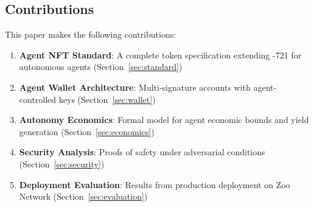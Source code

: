 \subsection{Contributions}

This paper makes the following contributions:

\begin{enumerate}
    \item \textbf{Agent NFT Standard}: A complete token specification extending \ERC{}-721 for autonomous agents (Section~\ref{sec:standard})

    \item \textbf{Agent Wallet Architecture}: Multi-signature accounts with agent-controlled keys (Section~\ref{sec:wallet})

    \item \textbf{Autonomy Economics}: Formal model for agent economic bounds and yield generation (Section~\ref{sec:economics})

    \item \textbf{Security Analysis}: Proofs of safety under adversarial conditions (Section~\ref{sec:security})

    \item \textbf{Deployment Evaluation}: Results from production deployment on Zoo Network (Section~\ref{sec:evaluation})
\end{enumerate}

